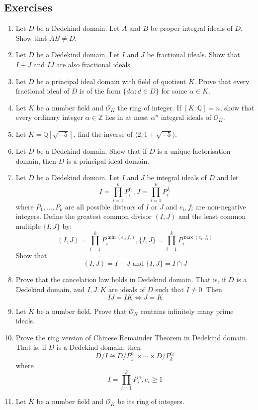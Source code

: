 \subsection{Exercises}
\begin{enumerate}
\item Let $D$ be a Dedekind domain. Let $A$ and $B$ be proper integral ideals of $D$. Show that $AB \neq D$.
\item Let $D$ be a Dedekind domain. Let $I$ and $J$ be fractional ideals. Show that $I+J$ and $IJ$ are also fractional ideals.
\item Let $D$ be a principal ideal domain with field of quotient $K$. Prove that every fractional ideal
of $D$ is of the form $\{d\alpha: d \in D\}$ for some $\alpha \in K$.
\item Let $K$ be a number field and $\mathcal{O}_K$ the ring of integer. If $[K:\mathbb{Q}]=n$, show that every ordinary integer $\alpha \in \mathbb{Z}$ lies in at most $\alpha^n$ integral ideals of $\mathcal{O}_K$.
\item Let $K=\mathbb{Q}[\sqrt{-5}]$, find the inverse of $\langle 2, 1+\sqrt{-5} \rangle$.
\item Let $D$ be a Dedekind domain. Show that if $D$ is a unique factorisation domain, then $D$ is a principal ideal domain.
\item Let $D$ be a Dedekind domain. Let $I$ and $J$ be integral ideals of $D$ and let
 $$I=\prod_{i=1}^k P^{e_i}_i, J=\prod_{i=1}^k P^{f_i}_i$$
where $P_1,\ldots,P_k$ are all possible divisors of $I$ or $J$ and $e_i, f_i$ are non-negative integers.
Define the greatest common divisor $(I,J)$ and the least common multiple $\{I,J\}$ by:
$$(I,J)=\prod_{i=1}^k P^{\min{(e_i,f_i)}}_i, \{I,J\}=\prod_{i=1}^k P^{\max{(e_i,f_i)}}_i$$
Show that
$$(I,J)=I+J \text{ and } \{I,J\}=I \cap J$$
\item  Prove that the cancelation law holds in Dedekind domain. That is, if $D$ is a Dedekind domain, and
$I,J,K$ are ideals of $D$ such that $I \neq 0$. Then
$$IJ=IK \iff J=K$$
\item Let $K$ be a number field. Prove that $\mathcal{O}_K$ contains infinitely many prime ideals.
\item Prove the ring version of Chinese Remainder Theorem in Dedekind domain. That is, if $D$ is a Dedekind domain, then
$$D/I \cong D/P^{e_1}_1 \times \cdots \times D/P^{e_k}_k$$
where
$$I=\prod_{i=1}^k P^{e_i}_i, e_i \ge 1$$
\item Let $K$ be a number field and $\mathcal{O}_K$ be its ring of integers.
      \begin{enumerate}

\end{enumerate}
\end{enumerate}
